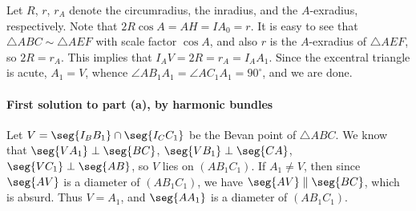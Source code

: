 Let $R$, $r$, $r_A$ denote the circumradius, the inradius, and the $A$-exradius, respectively. Note that $2R\cos A=AH=IA_0=r$. It is easy to see that $\triangle ABC\sim\triangle AEF$ with scale factor $\cos A$, and also $r$ is the $A$-exradius of $\triangle AEF$, so $2R=r_A$. This implies that $I_AV=2R=r_A=I_AA_1$. Since the excentral triangle is acute, $A_1=V$, whence $\angle AB_1A_1=\angle AC_1A_1=90^\circ$, and we are done. 

\paragraph{First solution to part (a), by harmonic bundles}     Let $V=\seg{I_BB_1}\cap\seg{I_CC_1}$ be the Bevan point of $\triangle ABC$. We know that $\seg{VA_1}\perp\seg{BC}$, $\seg{VB_1}\perp\seg{CA}$, $\seg{VC_1}\perp\seg{AB}$, so $V$ lies on $(AB_1C_1)$. If $A_1\ne V$, then since $\seg{AV}$ is a diameter of $(AB_1C_1)$, we have $\seg{AV}\parallel\seg{BC}$, which is absurd. Thus $V=A_1$, and $\seg{AA_1}$ is a diameter of $(AB_1C_1)$. 

